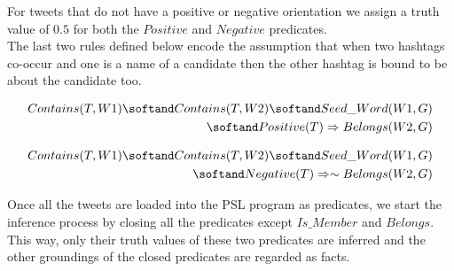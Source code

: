 For tweets that do not have a positive or negative orientation we assign a truth value of $0.5$ for both the $Positive$ and $Negative$ predicates.\\
The last two rules defined below encode the assumption that when two hashtags co-occur and one is a name of a candidate then the other hashtag is bound to be about the candidate too.

\begin{align*}
\begin{split}
Contains(T,W1)
 \softand Contains(T,W2)
  \softand Seed\_Word(W1,G)\\ 
  \softand Positive(T)
	\Rightarrow Belongs(W2,G)
\end{split}
\end{align*}

\begin{align*}
\begin{split}
Contains(T,W1) 
	\softand Contains(T,W2)
	\softand Seed\_Word(W1,G)\\ 
	\softand Negative(T)
	\Rightarrow \sim Belongs(W2,G)
\end{split}
\end{align*}

Once all the tweets are loaded into the PSL program as predicates, we start the inference process by closing all the predicates except $Is\_Member$ and $Belongs$. 
This way, only their truth values of these two predicates are inferred and the other groundings of the closed predicates are regarded as facts.

